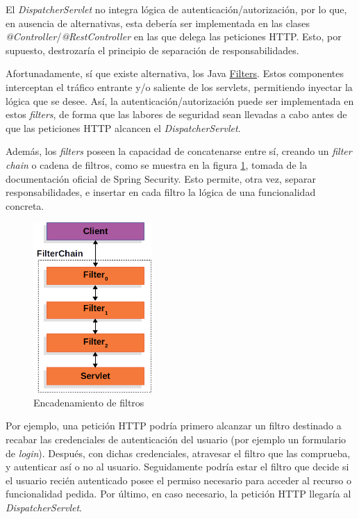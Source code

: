 \documentclass[a4paper]{article}
\begin{document}
	El \emph{DispatcherServlet} no integra lógica de autenticación/autorización, por lo que, en ausencia de alternativas, esta debería ser implementada en las clases \emph{@Controller}/\emph{@RestController} en las que delega las peticiones HTTP. Esto, por supuesto, destrozaría el principio de separación de responsabilidades. 
	
	Afortunadamente, sí que existe alternativa, los Java \href{https://www.oracle.com/java/technologies/filters.html}{Filters}. Estos componentes interceptan el tráfico entrante y/o saliente de los servlets, permitiendo inyectar la lógica que se desee. Así, la autenticación/autorización puede ser implementada en estos \emph{filters}, de forma que las labores de seguridad sean llevadas a cabo antes de que las peticiones HTTP alcancen el \emph{DispatcherServlet}.
	
	Además, los \emph{filters} poseen la capacidad de concatenarse entre sí, creando un \emph{filter chain} o cadena de filtros, como se muestra en la figura \ref{fig:filterchain}, tomada de la documentación oficial de Spring Security. Esto permite, otra vez, separar responsabilidades, e insertar en cada filtro la lógica de una funcionalidad concreta.
	
	\begin{figure}[hbt!]
		\centering
		\includegraphics[width=0.4\textwidth,keepaspectratio]{filterchain}
		\caption{Encadenamiento de filtros}
		\label{fig:filterchain}
	\end{figure}
	
	Por ejemplo, una petición HTTP podría primero alcanzar un filtro destinado a recabar las credenciales de autenticación del usuario (por ejemplo un formulario de \emph{login}). Después, con dichas credenciales, atravesar el filtro que las comprueba, y autenticar así o no al usuario. Seguidamente podría estar el filtro que decide si el usuario recién autenticado posee el permiso necesario para acceder al recurso o funcionalidad pedida. Por último, en caso necesario, la petición HTTP llegaría al \emph{DispatcherServlet}.
	
\end{document}
